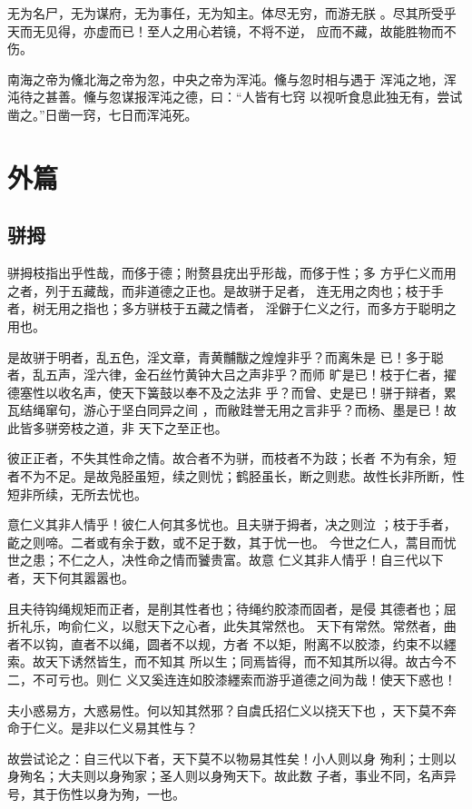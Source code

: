 \documentclass[a4paper,12pt,UTF8,twoside]{ctexbook}
\begin{document}
无为名尸，无为谋府，无为事任，无为知主。体尽无穷，而游无朕 。尽其所受乎天而无见得，亦虚而已！至人之用心若镜，不将不逆， 应而不藏，故能胜物而不伤。

南海之帝为儵北海之帝为忽，中央之帝为浑沌。儵与忽时相与遇于 浑沌之地，浑沌待之甚善。儵与忽谋报浑沌之德，曰：“人皆有七窍 以视听食息此独无有，尝试凿之。”日凿一窍，七日而浑沌死。

\chapter{外篇}

\section{骈拇}

骈拇枝指出乎性哉，而侈于德；附赘县疣出乎形哉，而侈于性；多 方乎仁义而用之者，列于五藏哉，而非道德之正也。是故骈于足者， 连无用之肉也；枝于手者，树无用之指也；多方骈枝于五藏之情者， 淫僻于仁义之行，而多方于聪明之用也。

是故骈于明者，乱五色，淫文章，青黄黼黻之煌煌非乎？而离朱是 已！多于聪者，乱五声，淫六律，金石丝竹黄钟大吕之声非乎？而师 旷是已！枝于仁者，擢德塞性以收名声，使天下簧鼓以奉不及之法非 乎？而曾、史是已！骈于辩者，累瓦结绳窜句，游心于坚白同异之间 ，而敝跬誉无用之言非乎？而杨、墨是已！故此皆多骈旁枝之道，非 天下之至正也。

彼正正者，不失其性命之情。故合者不为骈，而枝者不为跂；长者 不为有余，短者不为不足。是故凫胫虽短，续之则忧；鹤胫虽长，断之则悲。故性长非所断，性短非所续，无所去忧也。

意仁义其非人情乎！彼仁人何其多忧也。且夫骈于拇者，决之则泣 ；枝于手者，齕之则啼。二者或有余于数，或不足于数，其于忧一也。 今世之仁人，蒿目而忧世之患；不仁之人，决性命之情而饕贵富。故意 仁义其非人情乎！自三代以下者，天下何其嚣嚣也。

且夫待钩绳规矩而正者，是削其性者也；待绳约胶漆而固者，是侵 其德者也；屈折礼乐，呴俞仁义，以慰天下之心者，此失其常然也。 天下有常然。常然者，曲者不以钩，直者不以绳，圆者不以规，方者 不以矩，附离不以胶漆，约束不以纆索。故天下诱然皆生，而不知其 所以生；同焉皆得，而不知其所以得。故古今不二，不可亏也。则仁 义又奚连连如胶漆纆索而游乎道德之间为哉！使天下惑也！

夫小惑易方，大惑易性。何以知其然邪？自虞氏招仁义以挠天下也 ，天下莫不奔命于仁义。是非以仁义易其性与？

故尝试论之：自三代以下者，天下莫不以物易其性矣！小人则以身 殉利；士则以身殉名；大夫则以身殉家；圣人则以身殉天下。故此数 子者，事业不同，名声异号，其于伤性以身为殉，一也。
\end{document}
